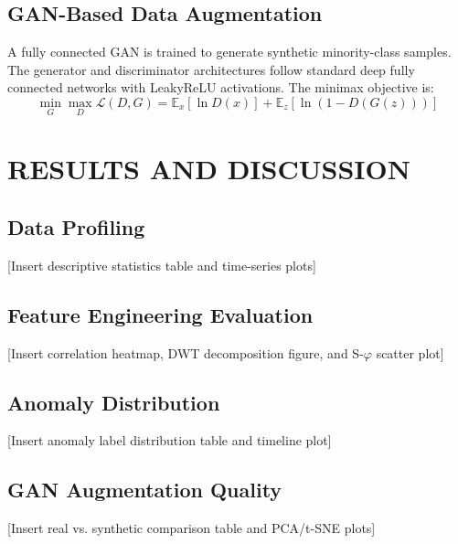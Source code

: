 \documentclass[conference]{IEEEtran}
\begin{document}
\subsection{GAN-Based Data Augmentation}

A fully connected GAN is trained to generate synthetic 
minority-class samples. The generator and discriminator 
architectures follow standard deep fully connected networks 
with LeakyReLU activations. The minimax objective is:
\begin{equation}
\min_G \max_D \mathcal{L}(D,G) = \mathbb{E}_{x}[\ln D(x)] + 
\mathbb{E}_{z}[\ln(1-D(G(z)))]
\label{eq:gan}
\end{equation}

\section{RESULTS AND DISCUSSION}
\label{sec:results}

\subsection{Data Profiling}

[Insert descriptive statistics table and time-series plots]

\subsection{Feature Engineering Evaluation}

[Insert correlation heatmap, DWT decomposition figure, 
and S-$\varphi$ scatter plot]

\subsection{Anomaly Distribution}

[Insert anomaly label distribution table and timeline plot]

\subsection{GAN Augmentation Quality}

[Insert real vs. synthetic comparison table and PCA/t-SNE plots]

\end{document}
